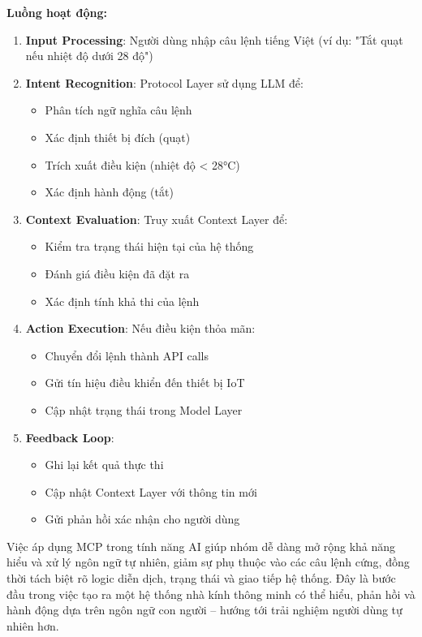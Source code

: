 \textbf{Luồng hoạt động:}
\begin{enumerate}
    \item \textbf{Input Processing}: Người dùng nhập câu lệnh tiếng Việt (ví dụ: "Tắt quạt nếu nhiệt độ dưới 28 độ")
    
    \item \textbf{Intent Recognition}: Protocol Layer sử dụng LLM để:
    \begin{itemize}
        \item Phân tích ngữ nghĩa câu lệnh
        \item Xác định thiết bị đích (quạt)
        \item Trích xuất điều kiện (nhiệt độ < 28°C)
        \item Xác định hành động (tắt)
    \end{itemize}

    \item \textbf{Context Evaluation}: Truy xuất Context Layer để:
    \begin{itemize}
        \item Kiểm tra trạng thái hiện tại của hệ thống
        \item Đánh giá điều kiện đã đặt ra
        \item Xác định tính khả thi của lệnh
    \end{itemize}
    \item \textbf{Action Execution}: Nếu điều kiện thỏa mãn:
    \begin{itemize}
        \item Chuyển đổi lệnh thành API calls
        \item Gửi tín hiệu điều khiển đến thiết bị IoT
        \item Cập nhật trạng thái trong Model Layer
    \end{itemize}

    \item \textbf{Feedback Loop}: 
    \begin{itemize}
        \item Ghi lại kết quả thực thi
        \item Cập nhật Context Layer với thông tin mới
        \item Gửi phản hồi xác nhận cho người dùng
    \end{itemize}
\end{enumerate}

Việc áp dụng MCP trong tính năng AI giúp nhóm dễ dàng mở rộng khả năng hiểu và xử lý ngôn ngữ tự nhiên, giảm sự phụ thuộc vào các câu lệnh cứng, đồng thời tách biệt rõ logic diễn dịch, trạng thái và giao tiếp hệ thống. Đây là bước đầu trong việc tạo ra một hệ thống nhà kính thông minh có thể hiểu, phản hồi và hành động dựa trên ngôn ngữ con người – hướng tới trải nghiệm người dùng tự nhiên hơn.

